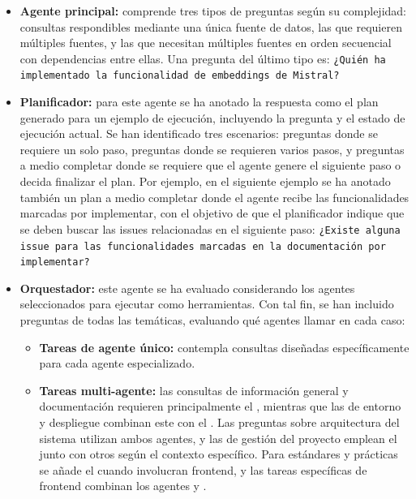 \begin{itemize}
  \item\textbf{Agente principal: }comprende tres tipos de preguntas según su complejidad: consultas respondibles mediante una única fuente de datos, las que requieren múltiples fuentes, y las que necesitan múltiples fuentes en orden secuencial con dependencias entre ellas. Una pregunta del último tipo es: \texttt{¿Quién ha implementado la funcionalidad de embeddings de Mistral?} 

  \item\textbf{Planificador: }para este agente se ha anotado la respuesta como el plan generado para un ejemplo de ejecución, incluyendo la pregunta y el estado de ejecución actual. Se han identificado tres escenarios: preguntas donde se requiere un solo paso, preguntas donde se requieren varios pasos, y preguntas a medio completar donde se requiere que el agente genere el siguiente paso o decida finalizar el plan. Por ejemplo, en el siguiente ejemplo se ha anotado también un plan a medio completar donde el agente recibe las funcionalidades marcadas por implementar, con el objetivo de que el planificador indique que se deben buscar las issues relacionadas en el siguiente paso: \texttt{¿Existe alguna issue para las funcionalidades marcadas en la documentación por implementar?} 
\item\textbf{Orquestador: }este agente se ha evaluado considerando los agentes seleccionados para ejecutar como herramientas. Con tal fin, se han incluido preguntas de todas las temáticas, evaluando qué agentes llamar en cada caso:

\begin{itemize}
\item \textbf{Tareas de agente único: }contempla consultas diseñadas específicamente para cada agente especializado.

\item \textbf{Tareas multi-agente:} las consultas de información general y documentación requieren principalmente el , mientras que las de entorno y despliegue combinan este con el . Las preguntas sobre arquitectura del sistema utilizan ambos agentes, y las de gestión del proyecto emplean el  junto con otros según el contexto específico. Para estándares y prácticas se añade el  cuando involucran frontend, y las tareas específicas de frontend combinan los agentes  y .


\end{itemize}
\end{itemize}
